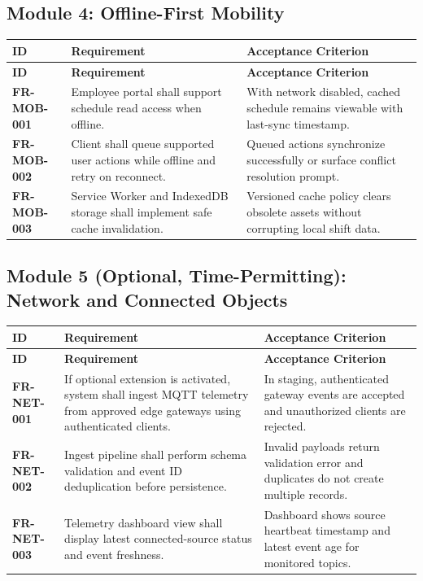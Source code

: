 \documentclass[11pt,a4paper]{article}
\newcommand{\req}[1]{\textbf{\textcolor{Primary}{#1}}}
\newcommand{\thead}[1]{\textcolor{HeaderText}{\textbf{#1}}}
\begin{document}
\subsection{Module 4: Offline-First Mobility}
\begin{longtable}{P{0.13\textwidth}P{0.47\textwidth}P{0.28\textwidth}}
\toprule
{}
\thead{ID} & \thead{Requirement} & \thead{Acceptance Criterion} \\
\midrule
\endfirsthead
\toprule
{}
\thead{ID} & \thead{Requirement} & \thead{Acceptance Criterion} \\
\midrule
\endhead
\req{FR-MOB-001} & Employee portal shall support schedule read access when offline. & With network disabled, cached schedule remains viewable with last-sync timestamp. \\
\req{FR-MOB-002} & Client shall queue supported user actions while offline and retry on reconnect. & Queued actions synchronize successfully or surface conflict resolution prompt. \\
\req{FR-MOB-003} & Service Worker and IndexedDB storage shall implement safe cache invalidation. & Versioned cache policy clears obsolete assets without corrupting local shift data. \\
\bottomrule
\end{longtable}

\subsection{Module 5 (Optional, Time-Permitting): Network and Connected Objects}
\begin{longtable}{P{0.13\textwidth}P{0.47\textwidth}P{0.28\textwidth}}
\toprule
{}
\thead{ID} & \thead{Requirement} & \thead{Acceptance Criterion} \\
\midrule
\endfirsthead
\toprule
{}
\thead{ID} & \thead{Requirement} & \thead{Acceptance Criterion} \\
\midrule
\endhead
\req{FR-NET-001} & If optional extension is activated, system shall ingest MQTT telemetry from approved edge gateways using authenticated clients. & In staging, authenticated gateway events are accepted and unauthorized clients are rejected. \\
\req{FR-NET-002} & Ingest pipeline shall perform schema validation and event ID deduplication before persistence. & Invalid payloads return validation error and duplicates do not create multiple records. \\
\req{FR-NET-003} & Telemetry dashboard view shall display latest connected-source status and event freshness. & Dashboard shows source heartbeat timestamp and latest event age for monitored topics. \\
\bottomrule
\end{longtable}
\end{document}
